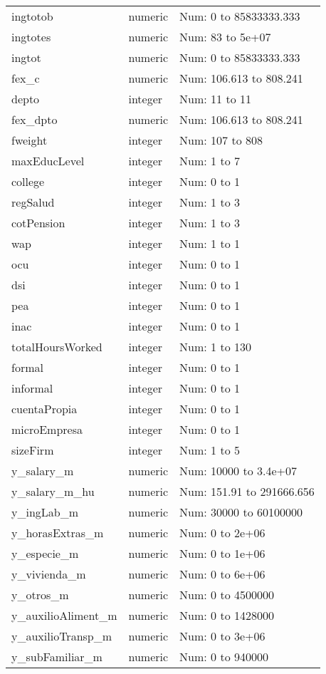 \begin{table}[!htbp]
\begin{tabular}{p{}p{}p{}}
ingtotob & numeric & Num: 0 to 85833333.333 \\ 
ingtotes & numeric & Num: 83 to 5e+07 \\ 
ingtot & numeric & Num: 0 to 85833333.333 \\ 
fex\_c & numeric & Num: 106.613 to 808.241 \\ 
depto & integer & Num: 11 to 11 \\ 
fex\_dpto & numeric & Num: 106.613 to 808.241 \\ 
fweight & integer & Num: 107 to 808 \\ 
maxEducLevel & integer & Num: 1 to 7 \\ 
college & integer & Num: 0 to 1 \\ 
regSalud & integer & Num: 1 to 3 \\ 
cotPension & integer & Num: 1 to 3 \\ 
wap & integer & Num: 1 to 1 \\ 
ocu & integer & Num: 0 to 1 \\ 
dsi & integer & Num: 0 to 1 \\ 
pea & integer & Num: 0 to 1 \\ 
inac & integer & Num: 0 to 1 \\ 
totalHoursWorked & integer & Num: 1 to 130 \\ 
formal & integer & Num: 0 to 1 \\ 
informal & integer & Num: 0 to 1 \\ 
cuentaPropia & integer & Num: 0 to 1 \\ 
microEmpresa & integer & Num: 0 to 1 \\ 
sizeFirm & integer & Num: 1 to 5 \\ 
y\_salary\_m & numeric & Num: 10000 to 3.4e+07 \\ 
y\_salary\_m\_hu & numeric & Num: 151.91 to 291666.656 \\ 
y\_ingLab\_m & numeric & Num: 30000 to 60100000 \\ 
y\_horasExtras\_m & numeric & Num: 0 to 2e+06 \\ 
y\_especie\_m & numeric & Num: 0 to 1e+06 \\ 
y\_vivienda\_m & numeric & Num: 0 to 6e+06 \\ 
y\_otros\_m & numeric & Num: 0 to 4500000 \\ 
y\_auxilioAliment\_m & numeric & Num: 0 to 1428000 \\ 
y\_auxilioTransp\_m & numeric & Num: 0 to 3e+06 \\ 
y\_subFamiliar\_m & numeric & Num: 0 to 940000 \\ 

\end{tabular}
\end{table}
